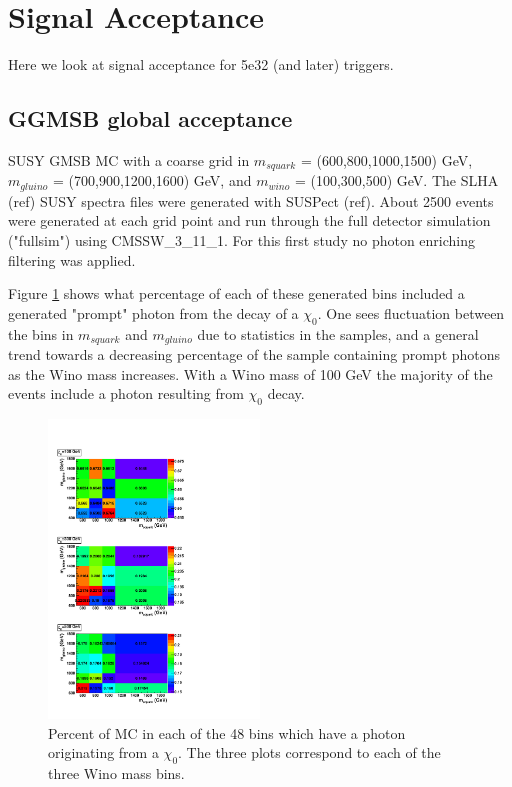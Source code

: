 \section{Signal Acceptance}
\label{sec:signalMC}

Here we look at signal acceptance for 5e32 (and later) triggers.

\subsection{GGMSB global acceptance}

SUSY GMSB MC with a coarse grid in $m_{squark}$ = (600,800,1000,1500) GeV, $m_{gluino}$ = (700,900,1200,1600) GeV,
and $m_{wino}$ = (100,300,500) GeV.  The SLHA (ref) SUSY spectra files were generated with SUSPect (ref).
About 2500 events were generated at each grid point and run through the full detector simulation ("fullsim") 
using CMSSW\_3\_11\_1.  For this first study no photon enriching filtering was applied.

Figure \ref{fig:genphotons} shows what percentage of each of these 
generated bins included a generated "prompt" photon from the decay of a $\chi_0$.  One sees fluctuation
between the bins in $m_{squark}$ and $m_{gluino}$ due to statistics in the samples, and a general
trend towards a decreasing percentage of the sample containing prompt photons as the Wino mass increases.
With a Wino mass of 100 GeV the majority of the events include a photon resulting from $\chi_0$ decay.

 \begin{figure}[!ht]
  \centering
 \includegraphics[width=0.5\textwidth]{figures/genphotonsnopu.pdf}
\caption{Percent of MC in each of the 48 bins which have a photon originating from a $\chi_0$.  The three
plots correspond to each of the three Wino mass bins.}
\label{fig:genphotons}
\end{figure}




